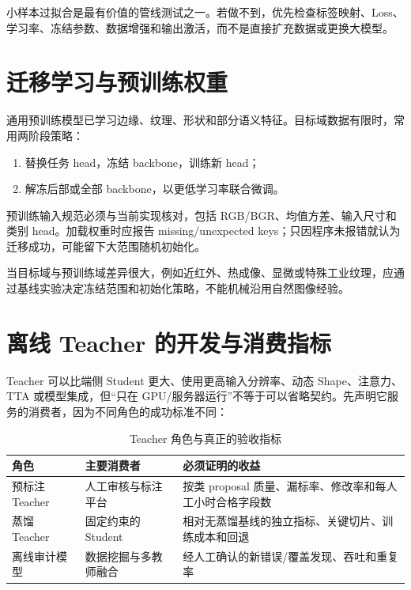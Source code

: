 小样本过拟合是最有价值的管线测试之一。若做不到，优先检查标签映射、Loss、学习率、冻结参数、数据增强和输出激活，而不是直接扩充数据或更换大模型。

\section{迁移学习与预训练权重}

通用预训练模型已学习边缘、纹理、形状和部分语义特征。目标域数据有限时，常用两阶段策略：

\begin{enumerate}
  \item 替换任务 head，冻结 backbone，训练新 head；
  \item 解冻后部或全部 backbone，以更低学习率联合微调。
\end{enumerate}

预训练输入规范必须与当前实现核对，包括 RGB/BGR、均值方差、输入尺寸和类别 head。加载权重时应报告 missing/unexpected keys；只因程序未报错就认为迁移成功，可能留下大范围随机初始化。

当目标域与预训练域差异很大，例如近红外、热成像、显微或特殊工业纹理，应通过基线实验决定冻结范围和初始化策略，不能机械沿用自然图像经验。

\section{离线 Teacher 的开发与消费指标}

Teacher 可以比端侧 Student 更大、使用更高输入分辨率、动态 Shape、注意力、TTA 或模型集成，但“只在 GPU/服务器运行”不等于可以省略契约。先声明它服务的消费者，因为不同角色的成功标准不同：

\begin{table}[H]
  \centering
  \caption{Teacher 角色与真正的验收指标}
  \begin{tabular}{p{30mm}p{40mm}p{62mm}}
    \hline
    角色 & 主要消费者 & 必须证明的收益 \\
    \hline
    预标注 Teacher & 人工审核与标注平台 & 按类 proposal 质量、漏标率、修改率和每人工小时合格字段数 \\
    蒸馏 Teacher & 固定约束的 Student & 相对无蒸馏基线的独立指标、关键切片、训练成本和回退 \\
    离线审计模型 & 数据挖掘与多教师融合 & 经人工确认的新错误/覆盖发现、吞吐和重复率 \\
    \hline
  \end{tabular}
\end{table}

